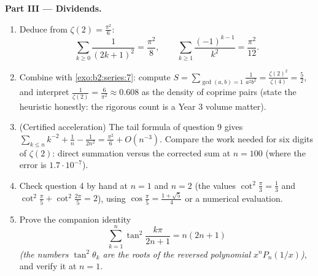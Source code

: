 \begin{problem}[{Weekend problem --- $\zeta(2) = \pi^2/6$ and the
Bertrand panorama}]
\medskip
\noindent\textbf{Part III --- Dividends.}
\begin{enumerate}[resume]
  \item Deduce from $\zeta(2) = \frac{\pi^2}6$:
        \[
        \sum_{k\geq0}\frac{1}{(2k+1)^2} = \frac{\pi^2}{8},
        \qquad
        \sum_{k\geq1}\frac{(-1)^{k-1}}{k^2} = \frac{\pi^2}{12}.
        \]
  \item Combine with \cref{exo:b2:series:7}: compute $S =
        \sum_{\gcd(a,b)=1}\frac{1}{a^2b^2} =
        \frac{\zeta(2)^2}{\zeta(4)} = \frac52$, and interpret
        $\frac{1}{\zeta(2)} = \frac{6}{\pi^2} \approx 0.608$ as
        the density of coprime pairs (state the heuristic
        honestly: the rigorous count is a Year 3 volume
        matter).
  \item (Certified acceleration) The tail formula of question 9
        gives $\sum_{k\leq n}k^{-2} + \frac1n - \frac1{2n^2} =
        \frac{\pi^2}6 + O(n^{-3})$. Compare the work needed for
        six digits of $\zeta(2)$: direct summation versus the
        corrected sum at $n = 100$ (where the error is
        $1.7\cdot10^{-7}$).
  \item Check question 4 by hand at $n = 1$ and $n = 2$ (the
        values $\cot^2\frac\pi3 = \frac13$ and
        $\cot^2\frac\pi5 + \cot^2\frac{2\pi}5 = 2$), using
        $\cos\frac\pi5 = \frac{1+\sqrt5}4$ or a numerical
        evaluation.
  \item Prove the companion identity
        \[
        \sum_{k=1}^{n}\tan^2\frac{k\pi}{2n+1} = n(2n+1)
        \]
        \emph{(the numbers $\tan^2\theta_k$ are the roots of the
        reversed polynomial $x^nP_n(1/x)$)}, and verify it at $n
        = 1$.
\end{enumerate}


\end{problem}
